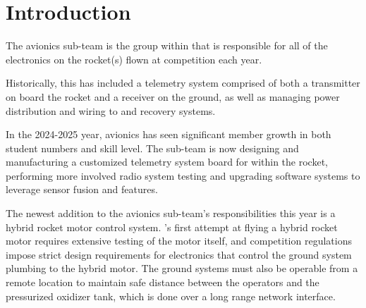 \section{Introduction}

The avionics sub-team is the group within  that is responsible for all of the electronics on the
rocket(s) flown at competition each year.

Historically, this has included a telemetry system comprised of both a transmitter on board the rocket and a receiver
on the ground, as well as managing power distribution and wiring to  and  recovery
systems.

In the 2024-2025 year, avionics has seen significant member growth in both student numbers and skill level. The
sub-team is now designing and manufacturing a customized telemetry system  board for within the rocket,
performing more involved radio system testing and upgrading software systems to leverage sensor fusion and
 features.

The newest addition to the avionics sub-team's responsibilities this year is a hybrid rocket motor control system.
's first attempt at flying a hybrid rocket motor requires extensive testing of the motor itself,
and competition regulations impose strict design requirements for electronics that control the ground system plumbing
to the hybrid motor. The ground systems must also be operable from a remote location to maintain safe distance between
the operators and the pressurized oxidizer tank, which is done over a long range network interface.
